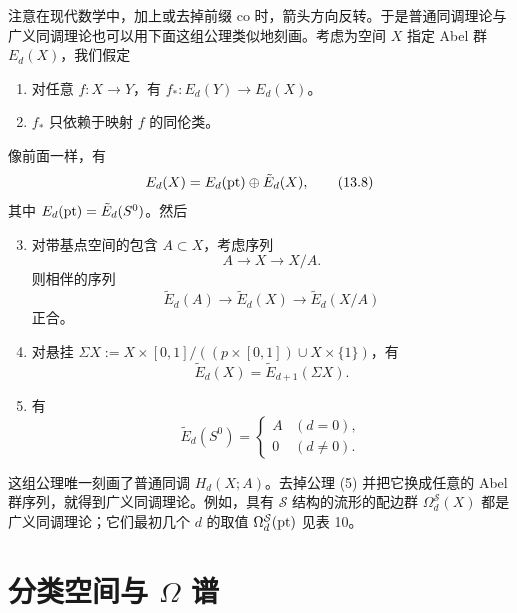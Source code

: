 注意在现代数学中，加上或去掉前缀 co 时，箭头方向反转。于是普通同调理论与广义同调理论也可以用下面这组公理类似地刻画。考虑为空间 $X$ 指定 Abel 群 $E_d(X)$，我们假定
\begin{enumerate}
  \item 对任意 $f:X\to Y$，有 $f_*:E_d(Y)\to E_d(X)$。
  \item $f_*$ 只依赖于映射 $f$ 的同伦类。
\end{enumerate}
像前面一样，有
\begin{equation}
E_d(X)=E_d(\mathrm{pt})\oplus\tilde E_d(X), \tag{13.8}
\end{equation}
其中 $E_d(\mathrm{pt})=\tilde E_d(S^0)$。然后
\begin{enumerate}
  \setcounter{enumi}{2}
  \item 对带基点空间的包含 $A\subset X$，考虑序列
\begin{equation}
A\to X\to X/A. \tag{13.9}
\end{equation}
则相伴的序列
\begin{equation}
\tilde E_d(A)\to\tilde E_d(X)\to\tilde E_d(X/A) \tag{13.10}
\end{equation}
正合。
  \item 对悬挂 $\Sigma X:=X\times[0,1]/((p\times[0,1])\cup X\times\{1\})$，有
\begin{equation}
\tilde E_d(X)=\tilde E_{d+1}(\Sigma X). \tag{13.11}
\end{equation}
\end{enumerate}

\begin{enumerate}
  \setcounter{enumi}{4}
  \item 有
\begin{equation}
\tilde E_d(S^0)=
\begin{cases}
A & (d=0),\\
0 & (d\neq0).
\end{cases} \tag{13.12}
\end{equation}
\end{enumerate}
这组公理唯一刻画了普通同调 $H_d(X;A)$。去掉公理 (5) 并把它换成任意的 Abel 群序列，就得到广义同调理论。例如，具有 $\mathcal S$ 结构的流形的配边群 $\Omega_d^{\mathcal S}(X)$ 都是广义同调理论；它们最初几个 $d$ 的取值 $\Omega_d^{\mathcal S}(\mathrm{pt})$ 见表 10。


\section{分类空间与 $\Omega$ 谱}

